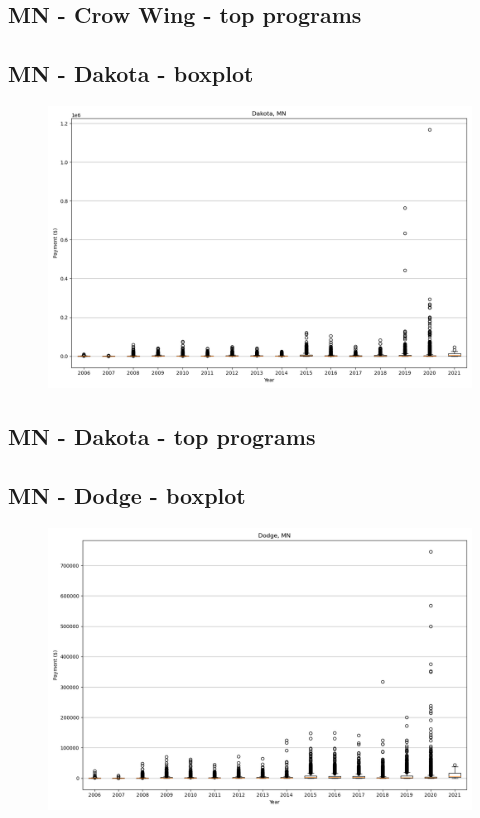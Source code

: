 \subsection*{MN - Crow Wing - top programs}

\newpage
\subsection*{MN - Dakota - boxplot}
\begin{figure}[h]
\centering
\includegraphics[width=7in]{../output/boxplots/counties/Dakota-MN_boxplot.png}
\end{figure}


\subsection*{MN - Dakota - top programs}

\newpage
\subsection*{MN - Dodge - boxplot}
\begin{figure}[h]
\centering
\includegraphics[width=7in]{../output/boxplots/counties/Dodge-MN_boxplot.png}
\end{figure}


